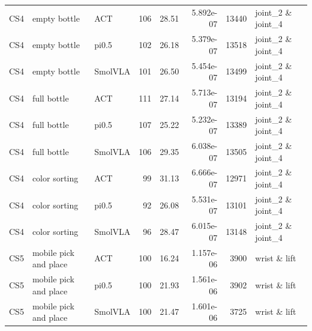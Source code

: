\begin{tabular}{lllrrrrl}
CS4 & empty bottle & ACT & 106 & 28.51 & 5.892e-07 & 13440 & joint\_2 \& joint\_4 \\
CS4 & empty bottle & pi0.5 & 102 & 26.18 & 5.379e-07 & 13518 & joint\_2 \& joint\_4 \\
CS4 & empty bottle & SmolVLA & 101 & 26.50 & 5.454e-07 & 13499 & joint\_2 \& joint\_4 \\
CS4 & full bottle & ACT & 111 & 27.14 & 5.713e-07 & 13194 & joint\_2 \& joint\_4 \\
CS4 & full bottle & pi0.5 & 107 & 25.22 & 5.232e-07 & 13389 & joint\_2 \& joint\_4 \\
CS4 & full bottle & SmolVLA & 106 & 29.35 & 6.038e-07 & 13505 & joint\_2 \& joint\_4 \\
CS4 & color sorting & ACT & 99 & 31.13 & 6.666e-07 & 12971 & joint\_2 \& joint\_4 \\
CS4 & color sorting & pi0.5 & 92 & 26.08 & 5.531e-07 & 13101 & joint\_2 \& joint\_4 \\
CS4 & color sorting & SmolVLA & 96 & 28.47 & 6.015e-07 & 13148 & joint\_2 \& joint\_4 \\
CS5 & mobile pick and place & ACT & 100 & 16.24 & 1.157e-06 & 3900 & wrist \& lift \\
CS5 & mobile pick and place & pi0.5 & 100 & 21.93 & 1.561e-06 & 3902 & wrist \& lift \\
CS5 & mobile pick and place & SmolVLA & 100 & 21.47 & 1.601e-06 & 3725 & wrist \& lift \\
\bottomrule
\end{tabular}
